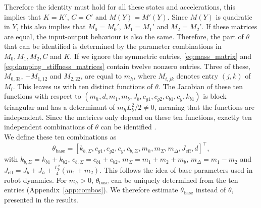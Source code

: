 Therefore the identity must hold for all
these states and accelerations, this implies that $K=K'$, $C=C'$
and $M(Y)=M'(Y)$. Since $M(Y)$ is quadratic in $Y$, this also 
implies that $M_0=M_0'$, $M_1=M_1'$ and $M_2=M_2'$. 
If these matrices are equal, the input-output behaviour is also the same. 
Therefore, the part of $\theta$ that can be identified is 
determined by the parameter combinations in $M_0,M_1,M_2,C$ and $K$.
If we ignore the symmetric entries, \eqref{eq:mass_matrix} and 
\eqref{eq:damping_stiffness_matrices} contain 
twelve nonzero entries. Three of these, $M_{0,33}$, $-M_{1,12}$ and $M_{2,22}$, 
are equal to $m_h$, where $M_{i,jk}$ denotes entry $(j,k)$ of $M_i$. This leaves us with ten distinct functions of $\theta$. 
The Jacobian of these ten functions with respect to 
$(m_h,d,m_1,m_b,J_b,c_{g1},c_{g2},c_{b1},c_y,k_{b1})$ 
is block triangular and has a determinant of $m_hL_b^2/2\neq0$, 
meaning that the functions are independent.
Since the matrices only depend on these ten functions, 
exactly ten independent combinations of $\theta$ can be identified 
 \cite[Def.~7]{ovchinnikov2021computing}.
\\
We define these ten combinations as
\begin{equation}
  \theta_{\mathrm{base}}=[k_{b,\Sigma},c_{g1},c_{g2},c_y,c_{b,\Sigma},
  m_h,m_\Sigma,m_\Delta,J_{\mathrm{eff}},d]^\top,
  \label{eq:phi}
\end{equation}
with $k_{b,\Sigma}=k_{b1}+k_{b2}$, $c_{b,\Sigma}=c_{b1}+c_{b2}$,
$m_\Sigma=m_1+m_2+m_b$, $m_\Delta=m_1-m_2$ and
$J_{\mathrm{eff}}=J_b+J_h+\tfrac{L_b^2}{4}(m_1+m_2)$. 
This follows the idea of base parameters used in robot dynamics.
For $m_h>0$, $\theta_{\mathrm{base}}$ can be uniquely determined from
the ten entries (Appendix~\ref{app:combos}).
We therefore estimate $\theta_{\mathrm{base}}$ instead of $\theta$,
presented in the results.
